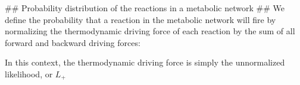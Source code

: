 ## Probability distribution of the reactions in a metabolic network ##
We define the probability that a reaction in the metabolic network will fire by normalizing the thermodynamic driving force of each reaction by the sum of all forward and backward driving forces:

In this context, the thermodynamic driving force is simply the unnormalized likelihood, or $L_+$
